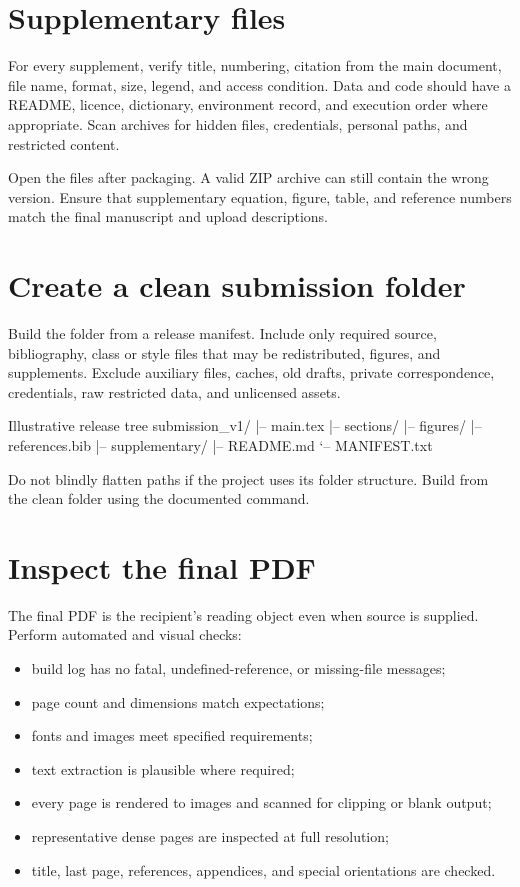 \section{Supplementary files}

For every supplement, verify title, numbering, citation from the main document,
file name, format, size, legend, and access condition. Data and code should have
a README, licence, dictionary, environment record, and execution order where
appropriate. Scan archives for hidden files, credentials, personal paths, and
restricted content.

Open the files after packaging. A valid ZIP archive can still contain the wrong
version. Ensure that supplementary equation, figure, table, and reference
numbers match the final manuscript and upload descriptions.

\section{Create a clean submission folder}

Build the folder from a release manifest. Include only required source,
bibliography, class or style files that may be redistributed, figures, and
supplements. Exclude auxiliary files, caches, old drafts, private correspondence,
credentials, raw restricted data, and unlicensed assets.

\begin{terminalcode}{Illustrative release tree}
submission_v1/
|-- main.tex
|-- sections/
|-- figures/
|-- references.bib
|-- supplementary/
|-- README.md
`-- MANIFEST.txt
\end{terminalcode}

Do not blindly flatten paths if the project uses its folder structure. Build
from the clean folder using the documented command.

\section{Inspect the final PDF}

The final PDF is the recipient's reading object even when source is supplied.
Perform automated and visual checks:

\begin{itemize}
  \item build log has no fatal, undefined-reference, or missing-file messages;
  \item page count and dimensions match expectations;
  \item fonts and images meet specified requirements;
  \item text extraction is plausible where required;
  \item every page is rendered to images and scanned for clipping or blank output;
  \item representative dense pages are inspected at full resolution;
  \item title, last page, references, appendices, and special orientations are checked.
\end{itemize}

